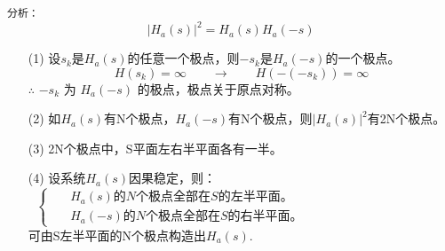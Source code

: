 \documentclass[notheorems,compress,mathserif,table]{beamer}
\begin{document}
\begin{frame}[allowframebreaks]
\begin{enumerate}
\end{enumerate}
\end{frame}
\begin{frame}\frametitle{}%
\texttt{分析：}
        $$|H_a(s)|^{2} = H_a(s)H_a(-s)$$
        \begin{enumerate}
          \item [(1)]设$s_{k}$是$H_a(s)$的任意一个极点，则$-s_{k}$是$H_a(-s)$的一个极点。
          $$ H(s_{k})=\infty\quad\quad \rightarrow \quad\quad H(-(-s_{k}))=\infty$$
             $\therefore$ $-s_{k}$ 为 $H_a(-s)$ 的极点，极点关于原点对称。
          \item [(2)]如$H_a(s)$有N个极点，$H_a(-s)$有N个极点，则$|H_a(s)|^{2}$有2N个极点。
          \item [(3)]2N个极点中，S平面左右半平面各有一半。
          \item [(4)]设系统$H_a(s)$因果稳定，则：
            $$
                \left\{ \begin{aligned}
                \mbox{ } & \mbox{$H_a(s)$的$N$个极点全部在$S$的左半平面。} \quad\quad\quad\quad\quad\quad\quad\quad\quad\quad\quad\quad\\
                \mbox{ } & \mbox{$H_a(-s)$的$N$个极点全部在$S$的右半平面。}
                \end{aligned} \right.
            $$
            可由S左半平面的N个极点构造出$H_a(s)$.
        \end{enumerate}
\end{frame}
\end{document}

